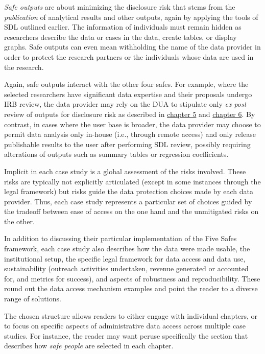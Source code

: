 \emph{Safe outputs} are about minimizing the disclosure risk that stems from the \emph{publication} of analytical results and other outputs, again by applying the tools of SDL outlined earlier. The information of individuals must remain hidden as researchers describe the data or cases in the data, create tables, or display graphs. Safe outputs can even mean withholding the name of the data provider in order to protect the research partners or the individuals whose data are used in the research.

Again, safe outputs interact with the other four safes. For example, where the selected researchers have significant data expertise and their proposals undergo IRB review, the data provider may rely on the DUA to stipulate only \emph{ex post} review of outputs for disclosure risk as described in \protect\hyperlink{discavoid}{chapter 5} and \protect\hyperlink{diffpriv}{chapter 6}. By contrast, in cases where the user base is broader, the data provider may choose to permit data analysis only in-house (i.e., through remote access) and only release publishable results to the user after performing SDL review, possibly requiring alterations of outputs such as summary tables or regression coefficients.

Implicit in each case study is a global assessment of the risks involved. These risks are typically not explicitly articulated (except in some instances through the legal framework) but risks guide the data protection choices made by each data provider. Thus, each case study represents a particular set of choices guided by the tradeoff between ease of access on the one hand and the unmitigated risks on the other.

In addition to discussing their particular implementation of the Five Safes framework, each case study also describes how the data were made usable, the institutional setup, the specific legal framework for data access and data use, sustainability (outreach activities undertaken, revenue generated or accounted for, and metrics for success), and aspects of robustness and reproducibility. These round out the data access mechanism examples and point the reader to a diverse range of solutions.

The chosen structure allows readers to either engage with individual chapters, or to focus on specific aspects of administrative data access across multiple case studies. For instance, the reader may want peruse specifically the section that describes how \emph{safe people} are selected in each chapter.

